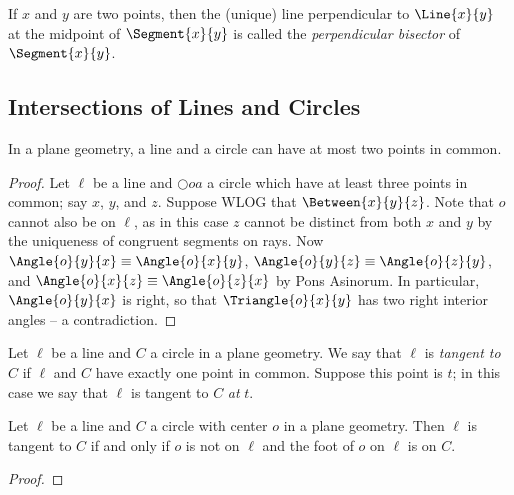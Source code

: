 \documentclass{article}
\begin{document}
\begin{dfn}
If $x$ and $y$ are two points, then the (unique) line perpendicular to $\Line{x}{y}$ at the midpoint of $\Segment{x}{y}$ is called the \emph{perpendicular bisector} of $\Segment{x}{y}$.
\end{dfn}

\subsection*{Intersections of Lines and Circles}

\begin{prop}
In a plane geometry, a line and a circle can have at most two points in common.
\end{prop}

\begin{proof}
Let $\ell$ be a line and $\Circle{o}{a}$ a circle which have at least three points in common; say $x$, $y$, and $z$. Suppose WLOG that $\Between{x}{y}{z}$. Note that $o$ cannot also be on $\ell$, as in this case $z$ cannot be distinct from both $x$ and $y$ by the uniqueness of congruent segments on rays. Now $\Angle{o}{y}{x} \equiv \Angle{o}{x}{y}$, $\Angle{o}{y}{z} \equiv \Angle{o}{z}{y}$, and $\Angle{o}{x}{z} \equiv \Angle{o}{z}{x}$ by Pons Asinorum. In particular, $\Angle{o}{y}{x}$ is right, so that $\Triangle{o}{x}{y}$ has two right interior angles -- a contradiction.
\end{proof}

\begin{dfn}[Tangent]
Let $\ell$ be a line and $C$ a circle in a plane geometry. We say that $\ell$ is \emph{tangent to} $C$ if $\ell$ and $C$ have exactly one point in common. Suppose this point is $t$; in this case we say that $\ell$ is tangent to $C$ \emph{at} $t$. 
\end{dfn}

\begin{prop}
Let $\ell$ be a line and $C$ a circle with center $o$ in a plane geometry. Then $\ell$ is tangent to $C$ if and only if $o$ is not on $\ell$ and the foot of $o$ on $\ell$ is on $C$.
\end{prop}

\begin{proof}

\end{proof}
\end{document}

